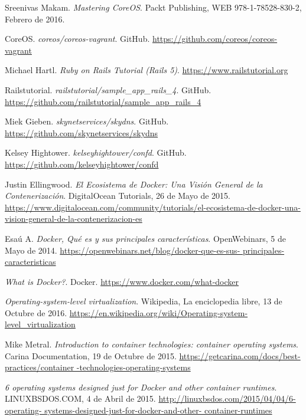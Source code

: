 \begin{thebibliography}{9}

Sreenivas Makam.
\textit{Mastering CoreOS}. 
Packt Publishing, WEB 978-1-78528-830-2, Febrero de 2016.

CoreOS.
\textit{coreos/coreos-vagrant}. GitHub.
\url{https://github.com/coreos/coreos-vagrant}

Michael Hartl.
\textit{Ruby on Rails Tutorial (Rails 5)}. 
\url{https://www.railstutorial.org}

Railstutorial.
\textit{railstutorial/sample\_app\_rails\_4}. GitHub.
\url{https://github.com/railstutorial/sample\_app\_rails\_4}

Miek Gieben.
\textit{skynetservices/skydns}. GitHub.
\url{https://github.com/skynetservices/skydns}

Kelsey Hightower.
\textit{kelseyhightower/confd}. GitHub.
\url{https://github.com/kelseyhightower/confd}

Justin Ellingwood.
\textit{El Ecosistema de Docker: Una Visión General de la Contenerización}. 
DigitalOcean Tutorials, 26 de Mayo de 2015.
\url{https://www.digitalocean.com/community/tutorials/el-ecosistema-de-docker-una-vision-general-de-la-contenerizacion-es}

Esaú A.
\textit{Docker, Qué es y sus principales características}. 
OpenWebinars, 5 de Mayo de 2014.
\url{https://openwebinars.net/blog/docker-que-es-sus-
principales-caracteristicas}

\textit{What is Docker?}. 
Docker.
\url{https://www.docker.com/what-docker}

\textit{Operating-system-level virtualization}. 
Wikipedia, La enciclopedia libre, 13 de Octubre de 2016.
\url{https://en.wikipedia.org/wiki/Operating-system-
level\_virtualization}

Mike Metral.
\textit{Introduction to container technologies: container operating systems}. 
Carina Documentation, 19 de Octubre de 2015.
\url{https://getcarina.com/docs/best-practices/container
-technologies-operating-systems}

\textit{6 operating systems designed just for Docker and other container runtimes}. 
LINUXBSDOS.COM, 4 de Abril de 2015.
\url{http://linuxbsdos.com/2015/04/04/6-operating-
systems-designed-just-for-docker-and-other-
container-runtimes}


\end{thebibliography}
